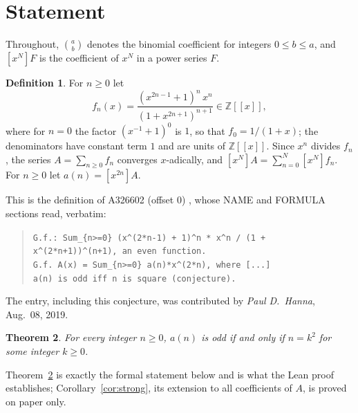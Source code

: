\documentclass[11pt]{amsart}
\theoremstyle{plain}
\newtheorem{theorem}{Theorem}
\theoremstyle{definition}
\newtheorem{definition}[theorem]{Definition}
\newcommand{\ZX}{\mathbb{Z}[[x]]}
\newcommand{\co}[1]{[x^{#1}]}
\begin{document}
\section{Statement}\label{sec:statement}

Throughout, $\binom ab$ denotes the binomial coefficient for integers $0\le b\le a$, and $\co N F$ is the coefficient of $x^N$ in a power series $F$.

\begin{definition}\label{def:main}
For $n\ge0$ let
\[
  f_n(x)=\frac{(x^{2n-1}+1)^n\,x^n}{(1+x^{2n+1})^{n+1}}\in\ZX,
\]
where for $n=0$ the factor $(x^{-1}+1)^0$ is $1$, so that $f_0=1/(1+x)$; the denominators have constant term $1$ and are units of $\ZX$.
Since $x^n$ divides $f_n$, the series $A=\sum_{n\ge0}f_n$ converges $x$-adically, and $\co NA=\sum_{n=0}^{N}\co Nf_n$. For $n\ge0$ let $a(n)=\co{2n}A$.
\end{definition}

This is the definition of A326602 (offset $0$) \cite{A326602}, whose NAME and FORMULA sections read, verbatim:
\begin{quote}\scriptsize
\verb|G.f.: Sum_{n>=0} (x^(2*n-1) + 1)^n * x^n / (1 + x^(2*n+1))^(n+1), an even function.|\\
\verb|G.f. A(x) = Sum_{n>=0} a(n)*x^(2*n), where [...]|\\
\verb|a(n) is odd iff n is square (conjecture).|
\end{quote}
The entry, including this conjecture, was contributed by \emph{Paul D.~Hanna}, Aug.~08, 2019.

\begin{theorem}\label{thm:main}
For every integer $n\ge0$, $a(n)$ is odd if and only if $n=k^2$ for some integer $k\ge0$.
\end{theorem}

Theorem~\ref{thm:main} is exactly the formal statement below and is what the Lean proof establishes; Corollary~\ref{cor:strong}, its extension to all coefficients of $A$, is proved on paper only.
\end{document}
